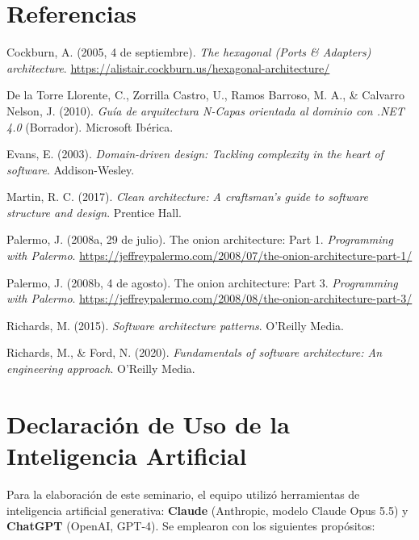\documentclass[11pt,a4paper]{article}
\begin{document}
\section*{Referencias}

\begingroup\raggedright
\begin{list}{}{\setlength{\leftmargin}{1.27cm}\setlength{\itemindent}{-1.27cm}%
\setlength{\itemsep}{6pt}\setlength{\parsep}{0pt}}
\item Cockburn, A. (2005, 4 de septiembre). \emph{The hexagonal (Ports \& Adapters)
architecture}. \url{https://alistair.cockburn.us/hexagonal-architecture/}
\item De la Torre Llorente, C., Zorrilla Castro, U., Ramos Barroso, M. A., \& Calvarro Nelson,
J. (2010). \emph{Guía de arquitectura N-Capas orientada al dominio con .NET 4.0} (Borrador).
Microsoft Ibérica.
\item Evans, E. (2003). \emph{Domain-driven design: Tackling complexity in the heart of
software}. Addison-Wesley.
\item Martin, R. C. (2017). \emph{Clean architecture: A craftsman's guide to software structure
and design}. Prentice Hall.
\item Palermo, J. (2008a, 29 de julio). The onion architecture: Part 1. \emph{Programming with
Palermo}. \url{https://jeffreypalermo.com/2008/07/the-onion-architecture-part-1/}
\item Palermo, J. (2008b, 4 de agosto). The onion architecture: Part 3. \emph{Programming with
Palermo}. \url{https://jeffreypalermo.com/2008/08/the-onion-architecture-part-3/}
\item Richards, M. (2015). \emph{Software architecture patterns}. O'Reilly Media.
\item Richards, M., \& Ford, N. (2020). \emph{Fundamentals of software architecture: An
engineering approach}. O'Reilly Media.
\end{list}
\endgroup

\section*{Declaración de Uso de la Inteligencia Artificial}

Para la elaboración de este seminario, el equipo utilizó herramientas de inteligencia
artificial generativa: \textbf{Claude} (Anthropic, modelo Claude Opus 5.5) y \textbf{ChatGPT}
(OpenAI, GPT-4). Se emplearon con los siguientes propósitos:
\end{document}
